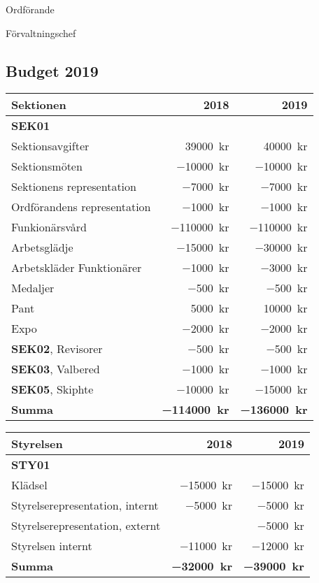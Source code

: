 \documentclass[../_main/handlingar.tex]{subfiles}
\begin{document}
\begin{signatures}{2}
    \ist
    \signature{\ordf}{Ordförande}
    \signature{\fvc}{Förvaltningschef}
\end{signatures}

\newpage
\subsection*{Budget 2019}
\begin{tabularx}{10cm}{X r r}
    \textbf{\large Sektionen} & \textbf{2018} & \textbf{2019} \\
    \hline
    \textbf{SEK01} \\
    Sektionsavgifter & \SI{39000}{kr} & \SI{40000}{kr} \\
    Sektionsmöten & \SI{-10000}{kr} & \SI{-10000}{kr} \\
    Sektionens representation & \SI{-7000}{kr} & \SI{-7000}{kr} \\
    Ordförandens representation & \SI{-1000}{kr} & \SI{-1000}{kr} \\
    Funkionärsvård & \SI{-110000}{kr} & \SI{-110000}{kr} \\
    Arbetsglädje & \SI{-15000}{kr} & \SI{-30000}{kr} \\
    Arbetskläder Funktionärer & \SI{-1000}{kr} & \SI{-3000}{kr} \\
    Medaljer & \SI{-500}{kr} & \SI{-500}{kr} \\
    Pant & \SI{5000}{kr} & \SI{10000}{kr} \\
    Expo & \SI{-2000}{kr} & \SI{-2000}{kr} \\
    \textbf{SEK02}, Revisorer & \SI{-500}{kr} & \SI{-500}{kr} \\
    \textbf{SEK03}, Valbered & \SI{-1000}{kr} & \SI{-1000}{kr} \\
    \textbf{SEK05}, Skiphte & \SI{-10000}{kr} & \SI{-15000}{kr} \\
    \hline
    \textbf{Summa} & \textbf{\SI{-114000}{kr}} & \textbf{\SI{-136000}{kr}} \\
\end{tabularx}

\begin{tabularx}{10cm}{X r r}
    \textbf{\large Styrelsen} & \textbf{2018} & \textbf{2019} \\
    \hline
    \textbf{STY01} \\
    Klädsel & \SI{-15000}{kr} & \SI{-15000}{kr} \\
    Styrelserepresentation, internt & \SI{-5000}{kr} & \SI{-5000}{kr} \\
    Styrelserepresentation, externt & \SI{}{} & \SI{-5000}{kr} \\
    Styrelsen internt & \SI{-11000}{kr} & \SI{-12000}{kr} \\
    \hline
    \textbf{Summa} & \textbf{\SI{-32000}{kr}} & \textbf{\SI{-39000}{kr}} \\
\end{tabularx}
\end{document}
